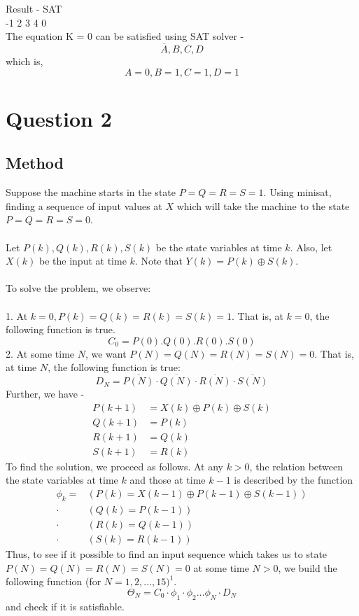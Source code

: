 \documentclass[12pt]{article}
\begin{document}
Result -
SAT\\
-1 2 3 4 0\\

The equation K = 0 can be satisfied using SAT solver -
\[\overline{A}, B, C, D\]
which is,
\[A = 0, B = 1, C = 1, D = 1\]

\section{Question 2}


\subsection{Method}
Suppose the machine starts in the state \(P=Q=R=S=1\). Using minisat, finding a sequence of input values at \(X\) which will take the machine to the state \(P=Q=R=S=0\).\\
\\
Let \(P(k), Q(k), R(k), S(k)\) be the state variables at time \(k\). Also, let \(X(k)\) be the input at time \(k\). Note that \(Y(k)=P(k) \oplus S(k)\).\\
\\
To solve the problem, we observe:\\
\\
1. At \(k=0, P(k)=Q(k)=R(k)=S(k)=1\). That is, at \(k=0\), the following function is true.
\[
C_{0}=P(0) . Q(0) . R(0) . S(0)
\]
2. At some time \(N\), we want \(P(N)=Q(N)=R(N)=S(N)=0\). That is, at time \(N\), the following function is true:
\[
D_{N}=\overline{P(N)} \cdot \overline{Q(N)} \cdot \overline{R(N)} \cdot \overline{S(N)}
\]
Further, we have -
\[
\begin{aligned}
P(k+1) & =X(k) \oplus P(k) \oplus S(k) \\
Q(k+1) & =P(k) \\
R(k+1) & =Q(k) \\
S(k+1) & =R(k)
\end{aligned}
\]
To find the solution, we proceed as follows. At any \(k>0\), the relation between the state variables at time \(k\) and those at time \(k-1\) is described by the function
\[
\begin{aligned}
\phi_{k}= & (P(k)=X(k-1) \oplus P(k-1) \oplus S(k-1)) \\
\cdot & (Q(k)=P(k-1)) \\
\cdot & (R(k)=Q(k-1)) \\
\cdot & (S(k)=R(k-1))
\end{aligned}
\]
Thus, to see if it possible to find an input sequence which takes us to state \(P(N)=Q(N)=R(N)=S(N)=0\) at some time \(N>0\), we build the following function (for \(N=1,2, \ldots, 15)^{1}\).
\[
\Theta_{N}=C_{0} \cdot \phi_{1} \cdot \phi_{2} \ldots \phi_{N} \cdot D_{N}
\]
and check if it is satisfiable.
\end{document}
